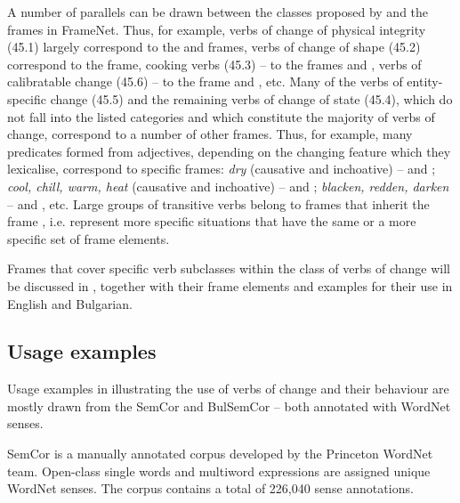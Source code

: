 \documentclass[output=paper,colorlinks,citecolor=brown]{langscibook}
\begin{document}
A number of parallels can be drawn between the classes proposed by \citet{Levin1993} and the frames in FrameNet. Thus, for example, verbs of change of physical integrity (45.1) largely correspond to the  and  frames, verbs of change of shape (45.2) correspond to the  frame, cooking verbs (45.3) -- to the frames  and , verbs of calibratable change (45.6) – to the frame  and , etc. Many of the verbs of entity-specific change (45.5) and the remaining verbs of change of state (45.4), which do not fall into the listed categories and which constitute the majority of verbs of change, correspond to a number of other frames. Thus, for example, many predicates formed from adjectives, depending on the changing feature which they lexicalise, correspond to specific frames: \textit{dry} (causative and inchoative) --  and ; \textit{cool, chill, warm, heat} (causative and inchoative)  --  and ; \textit{blacken, redden, darken} --  and , etc. Large groups of transitive verbs belong to frames that inherit the frame , i.e. represent more specific situations that have the same or a more specific set of frame elements.

Frames that cover specific verb subclasses within the class of verbs of change will be discussed in , together with their frame elements and examples for their use in English and Bulgarian.

\subsection{Usage examples}

Usage examples in  illustrating the use of verbs of change and their behaviour are mostly drawn from the SemCor and BulSemCor -- both annotated with WordNet senses.

SemCor \citep{miller-etal-1993-semantic,miller-etal-1994-using,landes1998} is a manually annotated corpus developed by the Princeton WordNet team. Open-class single words and multiword expressions are assigned unique WordNet senses. The corpus contains a total of 226,040 sense annotations.
\end{document}
